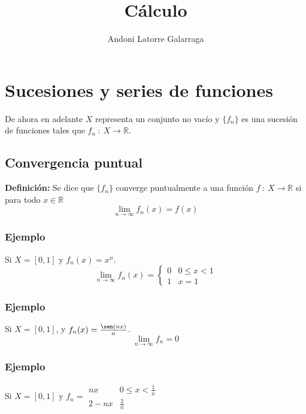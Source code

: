 \documentclass{article}
\title{Cálculo}
\author{Andoni Latorre Galarraga}
\date{}
\newcommand{\R}{\mathbb{R}}
\begin{document}
\maketitle


\section{Sucesiones y series de funciones}


De ahora en adelante $X$ representa un conjunto no vacío y $\{f_n\}$ es una sucesión de funciones tales que $f_n\::\:X\longrightarrow\R$.
\subsection{Convergencia puntual}

\textbf{Definición:} Se dice que $\{f_n\}$ converge puntualmente a una función $f\::\:X\longrightarrow\R$ si para todo $x\in \R$
$$
\lim_{n\to\infty}f_n(x)=f(x)
$$

\subsubsection{Ejemplo}

Si $X=[0,1]$ y $f_n(x)=x^n$.
$$
\lim_{n\to\infty}f_n(x)=
\left\{
    \begin{array}{ll}
        0 & 0\le x<1 \\
        1 & x=1
    \end{array}
\right.
$$

\subsubsection{Ejemplo}

Si $X=[0,1]$, y $f_n(x)=\frac{\sen(nx)}{n}$.
$$
\lim_{n\to\infty} f_n = 0
$$

\subsubsection{Ejemplo}

Si $X=[0,1]$ y $f_n= \begin{array}{ll}
    nx & 0\le x<\frac{1}{n} \\
    2-nx & \frac{2}{n}
\end{array}$
\end{document}
